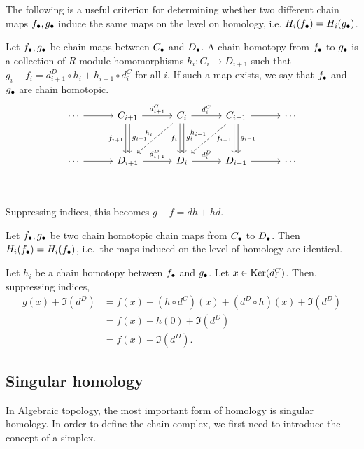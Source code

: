 The following is a useful criterion for determining whether two different chain maps $f_\bullet, g_\bullet$ induce the same maps on the level on homology, i.e. $H_i(f_\bullet) = H_i(g_\bullet)$.
\begin{definition}
    Let $f_\bullet, g_\bullet$ be chain maps between  $C_\bullet$ and $D_\bullet$.
    A chain homotopy from  $f_\bullet$ to  $g_\bullet$ is a collection of  $R$-module homomorphisms $h_i: C_i \to  D_{i+1}$ such that $g_i - f_i = d^{D}_{i+1}  \circ  h_i + h_{i-1}  \circ  d_i^{C}$ for all $i$.
    If such a map exists, we say that $f_\bullet$ and  $g_\bullet$ are chain homotopic.
    \[
        \begin{tikzcd}[column sep=3em, row sep=3em]
            \cdots  \arrow[r, ""]&
            C_{i+1} \arrow[r, "d_{i+1}^{C}"] \arrow[d, "f_{i+1}"', shift right=2pt] \arrow[d, "g_{i+1}", shift left=2pt]&
            C_{i} \arrow[r, "d_{i}^{C}"] \arrow[d, "f_i"', shift right=2pt] \arrow[d, "g_{i}", shift left=2pt] \arrow[dl, "h_i"', dashed]&
            C_{i-1} \arrow[r, ""] \arrow[d, "f_{i-1}"', shift right=2pt]\arrow[d, "g_{i-1}", shift left=2pt] \arrow[dl, "h_{i-1}"', dashed]&
            \cdots \\
            \cdots  \arrow[r, ""]&
            D_{i+1} \arrow[r, "d_{i+1}^{D}"] &
            D_{i} \arrow[r, "d_{i}^{D}"] &
            D_{i-1} \arrow[r, ""] &
            \cdots \\
        \end{tikzcd}
    \]
    Suppressing indices, this becomes $g - f = dh + hd$.
\end{definition}
\begin{prop}
    Let $f_\bullet, g_\bullet$ be two chain homotopic chain maps from $C_\bullet$ to $D_\bullet$. 
    Then $H_i(f_\bullet) = H_i(f_\bullet)$, i.e.\ the maps induced on the level of homology are identical.
\end{prop}
\begin{myproof}
    Let $h_i$ be a chain homotopy between  $f_\bullet$ and  $g_\bullet$.
    Let $x \in \operatorname{Ker}(d_i^{C})$.
    Then, suppressing indices,
    \begin{align*}
        g(x) + \Im(d^{D}) &= f(x) + (h  \circ  d^{C})(x) + (d^{D}  \circ h)(x)  + \Im(d^{D})\\
                          &= f(x) + h(0) + \Im(d^{D})\\
                        &= f(x) + \Im(d^{D}).
    \end{align*} 
\end{myproof}

\subsection*{Singular homology}
In Algebraic topology, the most important form of homology is singular homology.
In order to define the chain complex, we first need to introduce the concept of a simplex.

